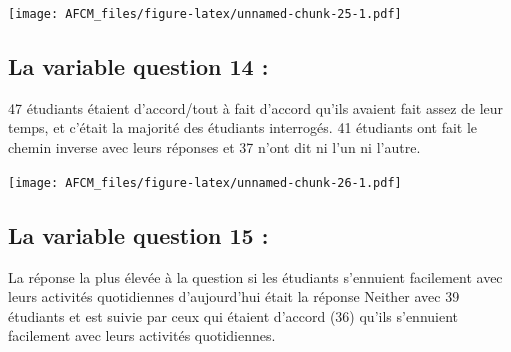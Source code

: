 \documentclass[
]{article}
\newenvironment{Shaded}{\begin{snugshade}}{\end{snugshade}}
\newcommand{\FunctionTok}[1]{\textcolor[rgb]{0.00,0.00,0.00}{#1}}
\newcommand{\NormalTok}[1]{#1}
\newcommand{\SpecialCharTok}[1]{\textcolor[rgb]{0.00,0.00,0.00}{#1}}
\newcommand{\StringTok}[1]{\textcolor[rgb]{0.31,0.60,0.02}{#1}}
\begin{document}
\begin{Shaded}
\end{Shaded}

\texttt{[image: AFCM\_files/figure-latex/unnamed-chunk-25-1.pdf]}

\hypertarget{la-variable-question-14}{%
\subsection{La variable question 14 :}\label{la-variable-question-14}}

47 étudiants étaient d'accord/tout à fait d'accord qu'ils avaient fait
assez de leur temps, et c'était la majorité des étudiants interrogés. 41
étudiants ont fait le chemin inverse avec leurs réponses et 37 n'ont dit
ni l'un ni l'autre.

\begin{Shaded}
\end{Shaded}

\texttt{[image: AFCM\_files/figure-latex/unnamed-chunk-26-1.pdf]}

\hypertarget{la-variable-question-15}{%
\subsection{La variable question 15 :}\label{la-variable-question-15}}

La réponse la plus élevée à la question si les étudiants s'ennuient
facilement avec leurs activités quotidiennes d'aujourd'hui était la
réponse Neither avec 39 étudiants et est suivie par ceux qui étaient
d'accord (36) qu'ils s'ennuient facilement avec leurs activités
quotidiennes.

\begin{Shaded}
\end{Shaded}
\end{document}
